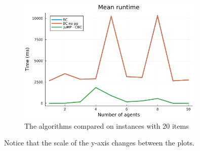 \documentclass[b5paper]{article}
\begin{document}
\begin{figure}[H]
    \centering
    \includegraphics[width=0.8\textwidth]{mean_1-10agents_20items.png}
    \caption{The algorithms compared on instances with 20 items}
\end{figure} 

Notice that the scale of the y-axis changes between the plots.
\end{document}
